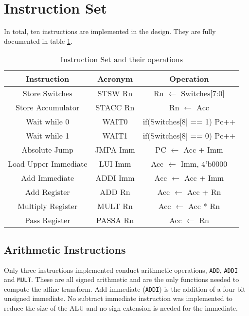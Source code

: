 

\section{Instruction Set}

In total, ten instructions are implemented in the design.
They are fully documented in table \ref{tab:isa}. 


\begin{table}
\caption{Instruction Set and their operations}
\label{tab:isa}
\begin{tabular}{ccc} \hline 
Instruction & Acronym & Operation \\ \hline
Store Switches & STSW Rn & Rn $\leftarrow$ Switches[7:0] \\
Store Accumulator & STACC Rn & Rn $\leftarrow$ Acc \\
Wait while 0 & WAIT0 & if(Switches[8] == 1) Pc++ \\
Wait while 1 & WAIT1 & if(Switches[8] == 0) Pc++ \\
Absolute Jump & JMPA Imm & PC $\leftarrow$ Acc + Imm \\
Load Upper Immediate & LUI Imm & Acc $\leftarrow$ {Imm, 4'b0000} \\
Add Immediate & ADDI Imm & Acc $\leftarrow$ Acc + Imm \\
Add Register & ADD Rn & Acc $\leftarrow$ Acc + Rn \\
Multiply Register & MULT Rn & Acc $\leftarrow$ Acc * Rn \\
Pass Register & PASSA Rn & Acc $\leftarrow$ Rn \\ \hline
\end{tabular}
\end{table}


\subsection{Arithmetic Instructions}

Only three instructions implemented conduct arithmetic operations, \texttt{ADD}, \texttt{ADDI} and \texttt{MULT}. 
These are all signed arithmetic and are the only functions needed to compute the affine transform. 
Add immediate (\texttt{ADDI}) is the addition of a four bit unsigned immediate. 
No subtract immediate instruction was implemented to reduce the size of the ALU and no sign extension is needed for the immediate. 

